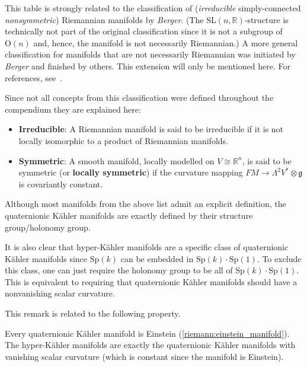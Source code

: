     \begin{remark*}
        This table is strongly related to the classification of (\textit{irreducible} simply-connected \textit{nonsymmetric}) Riemannian manifolds by \textit{Berger}. (The $\mathrm{SL}(n,\mathbb{R})$-structure is technically not part of the original classification since it is not a subgroup of $\mathrm{O}(n)$ and, hence, the manifold is not necessarily Riemannian.) A more general classification for manifolds that are not necessarily Riemannian was initiated by \textit{Berger} and finished by others. This extension will only be mentioned here. For references, see~\citet{rudolph_differential_2017}.

        Since not all concepts from this classification were defined throughout the compendium they are explained here:
        \begin{itemize}
            \item\textbf{Irreducible}: A Riemannian manifold is said to be irreducible if it is not locally isomorphic to a product of Riemannian manifolds.
            \item\textbf{Symmetric}: A smooth manifold, locally modelled on $V\cong\mathbb{R}^n$, is said to be symmetric (or \textbf{locally symmetric}) if the curvature mapping $FM\rightarrow\Lambda^2V^*\otimes\mathfrak{g}$ is covariantly constant.
        \end{itemize}
    \end{remark*}

    \begin{remark}
        Although most manifolds from the above list admit an explicit definition, the quaternionic K\"ahler manifolds are exactly defined by their structure group/holonomy group.

        It is also clear that hyper-K\"ahler manifolds are a specific class of quaternionic K\"ahler manifolds since $\mathrm{Sp}(k)$ can be embedded in $\mathrm{Sp}(k)\cdot\mathrm{Sp}(1)$. To exclude this class, one can just require the holonomy group to be all of $\mathrm{Sp}(k)\cdot\mathrm{Sp}(1)$. This is equivalent to requiring that quaternionic K\"ahler manifolds should have a nonvanishing scalar curvature.
    \end{remark}
    This remark is related to the following property.
    \begin{property}[Einstein]
        Every quaternionic K\"ahler manifold is Einstein (\cref{riemann:einstein_manifold}). The hyper-K\"ahler manifolds are exactly the quaternionic K\"ahler manifolds with vanishing scalar curvature (which is constant since the manifold is Einstein).
    \end{property}
